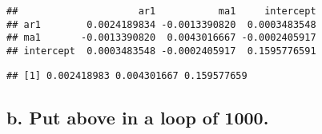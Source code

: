 \documentclass[]{article}
\newenvironment{Shaded}{\begin{snugshade}}{\end{snugshade}}
\newcommand{\DecValTok}[1]{\textcolor[rgb]{0.00,0.00,0.81}{#1}}
\newcommand{\KeywordTok}[1]{\textcolor[rgb]{0.13,0.29,0.53}{\textbf{#1}}}
\newcommand{\NormalTok}[1]{#1}
\newcommand{\OperatorTok}[1]{\textcolor[rgb]{0.81,0.36,0.00}{\textbf{#1}}}
\begin{document}
\begin{verbatim}
##                     ar1           ma1     intercept
## ar1        0.0024189834 -0.0013390820  0.0003483548
## ma1       -0.0013390820  0.0043016667 -0.0002405917
## intercept  0.0003483548 -0.0002405917  0.1595776591
\end{verbatim}

\begin{Shaded}
\end{Shaded}

\begin{verbatim}
## [1] 0.002418983 0.004301667 0.159577659
\end{verbatim}

\hypertarget{b.-put-above-in-a-loop-of-1000.}{%
\subsection{b. Put above in a loop of
1000.}\label{b.-put-above-in-a-loop-of-1000.}}
\end{document}
